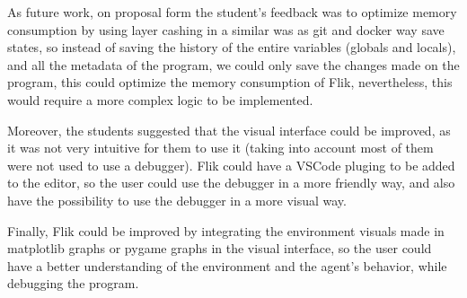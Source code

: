 As future work, on proposal form the student's feedback was to optimize memory consumption by 
using layer cashing in a similar was as git and docker way save states, so instead of saving the
history of the entire variables (globals and locals), and all the metadata of the program, we could 
only save the changes made on the program, this could optimize the memory consumption of \ac{Flik},
nevertheless, this would require a more complex logic to be implemented. 

Moreover, the students suggested that the visual interface could be improved, as it was not very 
intuitive for them to use it (taking into account most of them were not used to use a debugger).
\ac{Flik} could have a VSCode pluging to be added to the editor, so the user could use the debugger 
in a more friendly way, and also have the possibility to use the debugger in a more visual way.

Finally, \ac{Flik} could be improved by integrating the environment visuals made in matplotlib
graphs or pygame graphs in the visual interface, so the user could have a better understanding of 
the environment and the agent's behavior, while debugging the program.

